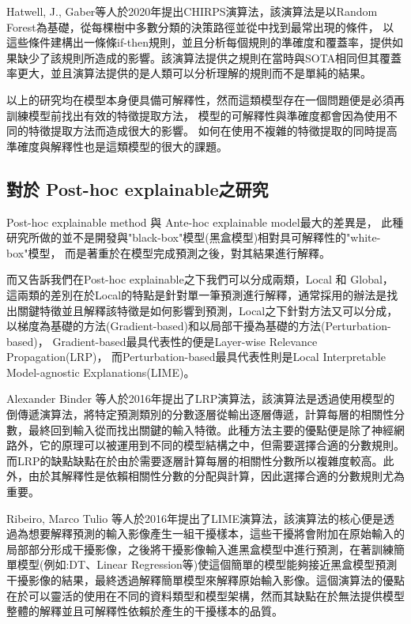 \documentclass[class=NCU_thesis, crop=false]{standalone}
\begin{document}
Hatwell, J., Gaber等人於2020年提出CHIRPS演算法\cite{hatwell2020chirps}，該演算法是以Random Forest為基礎，從每棵樹中多數分類的決策路徑並從中找到最常出現的條件，
以這些條件建構出一條條if-then規則，並且分析每個規則的準確度和覆蓋率，提供如果缺少了該規則所造成的影響。該演算法提供之規則在當時與SOTA相同但其覆蓋率更大，並且演算法提供的是人類可以分析理解的規則而不是單純的結果。

以上的研究均在模型本身便具備可解釋性，然而這類模型存在一個問題便是必須再訓練模型前找出有效的特徵提取方法，
模型的可解釋性與準確度都會因為使用不同的特徵提取方法而造成很大的影響。
如何在使用不複雜的特徵提取的同時提高準確度與解釋性也是這類模型的很大的課題。

\subsection{對於 Post-hoc explainable之研究}
Post-hoc explainable method 與 Ante-hoc explainable model最大的差異是，
此種研究所做的並不是開發與"black-box"模型(黑盒模型)相對具可解釋性的"white-box"模型，
而是著重於在模型完成預測之後，對其結果進行解釋。

而\cite{Nielsen_2022}又告訴我們在Post-hoc explainable之下我們可以分成兩類，Local 和 Global，
這兩類的差別在於Local的特點是針對單一筆預測進行解釋，通常採用的辦法是找出關鍵特徵並且解釋該特徵是如何影響到預測，Local之下針對方法又可以分成，以梯度為基礎的方法(Gradient-based)和以局部干擾為基礎的方法(Perturbation-based)，
Gradient-based最具代表性的便是Layer-wise Relevance Propagation(LRP)\cite{10.1007/978-3-319-44781-0_8}，
而Perturbation-based最具代表性則是Local Interpretable Model-agnostic Explanations(LIME)\cite{10.1145/2939672.2939778}。

Alexander Binder 等人於2016年提出了LRP演算法\cite{10.1007/978-3-319-44781-0_8}，該演算法是透過使用模型的倒傳遞演算法，將特定預測類別的分數逐層從輸出逐層傳遞，計算每層的相關性分數，最終回到輸入從而找出關鍵的輸入特徵。此種方法主要的優點便是除了神經網路外，它的原理可以被運用到不同的模型結構之中，但需要選擇合適的分數規則。而LRP的缺點缺點在於由於需要逐層計算每層的相關性分數所以複雜度較高。此外，由於其解釋性是依賴相關性分數的分配與計算，因此選擇合適的分數規則尤為重要。

Ribeiro, Marco Tulio 等人於2016年提出了LIME演算法\cite{10.1145/2939672.2939778}，該演算法的核心便是透過為想要解釋預測的輸入影像產生一組干擾樣本，這些干擾將會附加在原始輸入的局部部分形成干擾影像，之後將干擾影像輸入進黑盒模型中進行預測，在著訓練簡單模型(例如:DT、Linear Regression等)使這個簡單的模型能夠接近黑盒模型預測干擾影像的結果，最終透過解釋簡單模型來解釋原始輸入影像。這個演算法的優點在於可以靈活的使用在不同的資料類型和模型架構，然而其缺點在於無法提供模型整體的解釋並且可解釋性依賴於產生的干擾樣本的品質。
\end{document}
